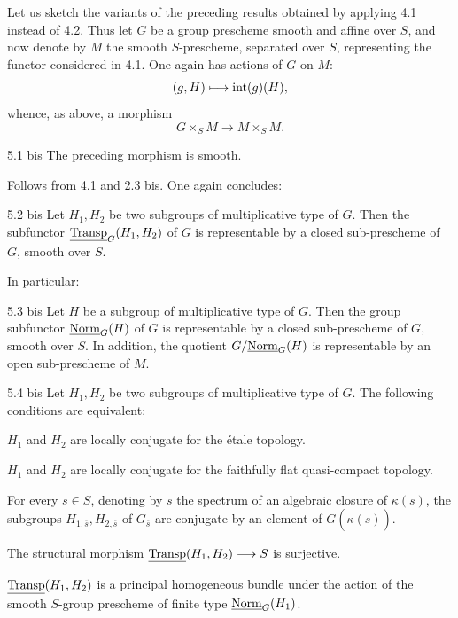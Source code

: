 Let us sketch the variants of the preceding results obtained by applying 4.1 instead of 4.2. Thus let $G$ be a group prescheme smooth and affine over $S$, and now denote by $M$ the smooth $S$-prescheme, separated over $S$, representing the functor considered in 4.1. One again has actions of $G$ on $M$:
\[
(g,H)\longmapsto\operatorname{int}(g)(H),
\]
whence, as above, a morphism
\begin{equation}\tag{x bis}
G\times_S M\to M\times_S M.
\end{equation}
\begin{corollary}{5.1 bis}\label{XI.5.1bis}
The preceding morphism is smooth.
\end{corollary}
Follows from 4.1 and 2.3 bis. One again concludes:
\begin{corollary}{5.2 bis}\label{XI.5.2bis}
Let $H_1,H_2$ be two subgroups of multiplicative type of $G$. Then the subfunctor $\underline{\operatorname{Transp}}_G(H_1,H_2)$ of $G$ is representable by a closed sub-prescheme of $G$, smooth over $S$.
\end{corollary}
In particular:
\begin{corollary}{5.3 bis}\label{XI.5.3bis}
Let $H$ be a subgroup of multiplicative type of $G$. Then the group subfunctor $\underline{\mathrm{Norm}}_G(H)$ of $G$ is representable by a closed sub-prescheme of $G$, smooth over $S$. In addition, the quotient $G/\underline{\mathrm{Norm}}_G(H)$ is representable by an open sub-prescheme of $M$.
\end{corollary}
\begin{corollary}{5.4 bis}\label{XI.5.4bis}
Let $H_1,H_2$ be two subgroups of multiplicative type of $G$. The following conditions are equivalent:
\begin{enumeratei}
\item $H_1$ and $H_2$ are locally conjugate for the étale topology.
\item[(i bis)] $H_1$ and $H_2$ are locally conjugate for the faithfully flat quasi-compact topology.
\item For every $s\in S$, denoting by $\overline s$ the spectrum of an algebraic closure of $\kappa(s)$, the subgroups $H_{1,\overline s},H_{2,\overline s}$ of $G_{\overline s}$ are conjugate by an element of $G(\overline{\kappa(s)})$.
\item[(ii bis)] The structural morphism $\underline{\operatorname{Transp}}(H_1,H_2)\longrightarrow S$ is surjective.
\item $\underline{\operatorname{Transp}}(H_1,H_2)$ is a principal homogeneous bundle under the action of the smooth $S$-group prescheme of finite type $\underline{\mathrm{Norm}}_G(H_1)$.
\end{enumeratei}
\end{corollary}
